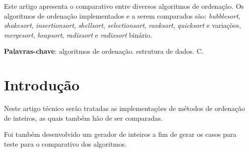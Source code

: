 \documentclass[
	article,			%
	11pt,				%
	oneside,			%
	a4paper,			%
	english,			%
	brazil,				%
	sumario=tradicional
	]{abntex2}
\begin{document}

\frenchspacing 


%
%
\maketitle

\begin{resumoumacoluna}
 Este artigo apresenta o comparativo entre diversos algoritmos de ordenação. Os algoritmos de ordenação implementados e a serem comparados são: \emph{bubblesort}, \emph{shakesort}, \emph{insertionsort}, \emph{shellsort}, \emph{selectionsort}, \emph{ranksort}, \emph{quicksort} e variações, \emph{mergesort}, \emph{heapsort}, \emph{radixsort} e \emph{radixsort} binário.
 
 \vspace{\onelineskip}
 
 \noindent
 \textbf{Palavras-chave}: algoritmos de ordenação. estrutura de dados. C.
\end{resumoumacoluna}


\textual

\section*{Introdução}

Neste artigo técnico serão tratadas as implementações de métodos de ordenação de inteiros, as quais também hão de ser comparadas.

Foi também desenvolvido um gerador de inteiros a fim de gerar os casos para teste para o comparativo dos algoritmos.
\end{document}
